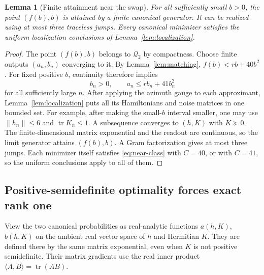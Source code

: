 \documentclass[11pt]{article}
\newtheorem{lemma}[theorem]{Lemma}
\theoremstyle{definition}
\theoremstyle{remark}
\DeclareMathOperator{\tr}{tr}
\newcommand{\Q}{\mathcal Q_2}
\newcommand{\PSD}{\succeq0}
\begin{document}
\begin{lemma}[Finite attainment near the swap]\label{lem:attainment}
For all sufficiently small \(b>0\), the point \((f(b),b)\) is attained by a finite canonical generator. It can be realized using at most three traceless jumps. Every canonical minimizer satisfies the uniform localization conclusions of Lemma~\ref{lem:localization}.
\end{lemma}
\begin{proof}
The point \((f(b),b)\) belongs to \(\Q\) by compactness. Choose finite outputs \((a_n,b_n)\) converging to it. By Lemma~\ref{lem:matching},
\(f(b)<rb+40b^2\). For fixed positive \(b\), continuity therefore implies
\[
 b_n>0,\qquad a_n\leq rb_n+41b_n^2
\]
for all sufficiently large \(n\). After applying the azimuth gauge to each approximant, Lemma~\ref{lem:localization} puts all its Hamiltonians and noise matrices in one bounded set. For example, after making the small-\(b\) interval smaller, one may use \(\|h_n\|\leq6\) and \(\tr K_n\leq1\). A subsequence converges to \((h,K)\) with \(K\PSD\). The finite-dimensional matrix exponential and the readout are continuous, so the limit generator attains \((f(b),b)\). A Gram factorization gives at most three jumps. Each minimizer itself satisfies \eqref{eq:near-class} with \(C=40\), or with \(C=41\), so the uniform conclusions apply to all of them.
\end{proof}

\subsection{Positive-semidefinite optimality forces exact rank one}
View the two canonical probabilities as real-analytic functions \(a(h,K)\), \(b(h,K)\) on the ambient real vector space of \(h\) and Hermitian \(K\). They are defined there by the same matrix exponential, even when \(K\) is not positive semidefinite. Their matrix gradients use the real inner product \(\langle A,B\rangle=\tr(AB)\).
\end{document}
